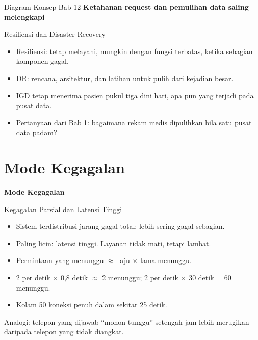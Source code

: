 \documentclass[aspectratio=169, table, 12pt]{beamer}
\begin{document}
\begin{frame}{{\Large Diagram Konsep Bab 12}}
  \centering
  {\small\bfseries Ketahanan request dan pemulihan data saling melengkapi}\par\medskip
\end{frame}

\begin{frame}{{\Large Resiliensi dan Disaster Recovery}}
  \vspace{10pt}
  \begin{itemize}
    \item Resiliensi: tetap melayani, mungkin dengan fungsi terbatas, ketika sebagian komponen
          gagal.
    \item DR: rencana, arsitektur, dan latihan untuk pulih dari kejadian besar.
    \item IGD tetap menerima pasien pukul tiga dini hari, apa pun yang terjadi pada pusat data.
    \item Pertanyaan dari Bab 1: bagaimana rekam medis dipulihkan bila satu pusat data padam?
  \end{itemize}
\end{frame}

\section{Mode Kegagalan}

\begin{frame}{\hfill}
  \centering
  \Huge{\textbf{Mode Kegagalan}}
\end{frame}

\begin{frame}{{\Large Kegagalan Parsial dan Latensi Tinggi}}
  \vspace{6pt}
  \small
  \begin{itemize}
    \item Sistem terdistribusi jarang gagal total; lebih sering gagal sebagian.
    \item Paling licin: latensi tinggi. Layanan tidak mati, tetapi lambat.
    \item Permintaan yang menunggu $\approx$ laju $\times$ lama menunggu.
    \item 2 per detik $\times$ 0,8 detik $\approx$ 2 menunggu; 2 per detik $\times$ 30 detik =
          60 menunggu.
    \item Kolam 50 koneksi penuh dalam sekitar 25 detik.
  \end{itemize}
  \vspace{4pt}
  {\small Analogi: telepon yang dijawab ``mohon tunggu'' setengah jam lebih merugikan daripada
  telepon yang tidak diangkat.}
\end{frame}
\end{document}
